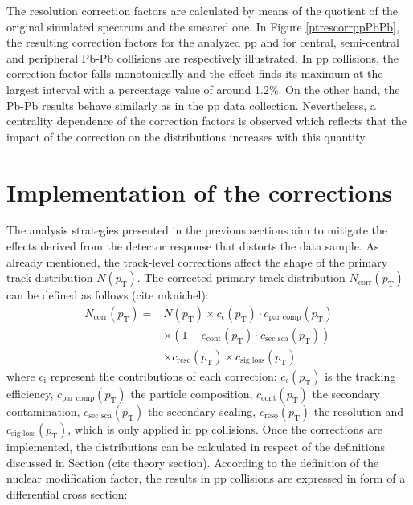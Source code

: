 \documentclass[12pt,a4paper]{report}
\begin{document}
The \pt resolution correction factors are calculated by means of the quotient of the original simulated \pt spectrum and the smeared one. In Figure \ref{ptrescorrppPbPb}, the resulting correction factors for the analyzed pp and for central, semi-central and peripheral Pb-Pb collisions are respectively illustrated. In pp collisions, the correction factor falls monotonically and the effect finds its maximum at the largest \pt interval with a percentage value of around 1.2\%. On the other hand, the Pb-Pb results behave similarly as in the pp data collection. Nevertheless, a centrality dependence of the correction factors is observed which reflects that the impact of the correction on the \pt distributions increases with this quantity.
\section{Implementation of the corrections}
The analysis strategies presented in the previous sections aim to mitigate the effects derived from the detector response that distorts the data sample. As already mentioned, the track-level corrections affect the shape of the primary track distribution $N(p_\text{T})$. The corrected primary track distribution $N_\text{corr}(p_\text{T})$ can be defined as follows (cite mknichel):
\begin{equation}
\begin{split}
N_\text{corr}(p_\text{T}) = & N(p_\text{T}) \times c_\epsilon(p_\text{T}) \cdot c_\text{par comp}(p_\text{T})\\
& \times (1 - c_\text{cont}(p_\text{T}) \cdot c_\text{sec sca}(p_\text{T})) \\
&\times c_\text{reso}(p_\text{T}) \times c_\text{sig loss}(p_\text{T})
\end{split}
\end{equation}
where $c_\text{i}$ represent the contributions of each correction: $c_\epsilon(p_\text{T})$ is the tracking efficiency, $c_\text{par comp}(p_\text{T})$ the particle composition, $c_\text{cont}(p_\text{T})$ the secondary contamination, $c_\text{sec sca}(p_\text{T})$ the secondary scaling, $c_\text{reso}(p_\text{T})$ the \pt resolution and  $c_\text{sig loss}(p_\text{T})$, which is only applied in pp collisions. Once the corrections are implemented, the \pt distributions can be calculated in respect of the definitions discussed in Section (cite theory section).
According to the definition of the nuclear modification factor, the results in pp collisions are expressed in form of a differential cross section: 
\end{document}
